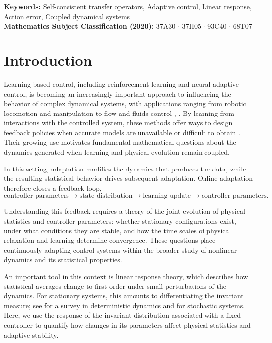 \documentclass[11pt]{article}
\theoremstyle{definition}
\theoremstyle{remark}
\begin{document}
\textbf{Keywords:} Self-consistent transfer operators, Adaptive control, Linear response, Action error, Coupled dynamical systems \\
\textbf{Mathematics Subject Classification (2020):} 37A30 $\cdot$ 37H05 $\cdot$ 93C40 $\cdot$ 68T07

\tableofcontents

\section{Introduction}


Learning-based control, including reinforcement learning and neural adaptive control, is becoming an increasingly important approach to influencing the behavior of complex dynamical systems, with applications ranging from robotic locomotion and manipulation to flow and fluids control \cite{TangEtAl2025}, \cite{BruntonEtAl2020}. By learning from interactions with the controlled system, these methods offer ways to design feedback policies when accurate models are unavailable or difficult to obtain \cite{Recht2019} \cite{Annaswamy2023}. Their growing use motivates fundamental mathematical questions about the dynamics generated when learning and physical evolution remain coupled.

In this setting, adaptation modifies the dynamics that produces the data, while the resulting statistical behavior drives subsequent adaptation.
Online adaptation therefore closes a feedback loop,
\[
  \text{controller parameters}
  \longrightarrow
  \text{state distribution}
  \longrightarrow
  \text{learning update}
  \longrightarrow
  \text{controller parameters}.
\]

Understanding this feedback requires a theory of the joint evolution of physical statistics and controller parameters: whether stationary configurations exist, under what conditions they are stable, and how the time scales of physical relaxation and learning determine convergence. These questions place continuously adapting control systems within the broader study of nonlinear dynamics and its statistical properties.


An important tool in this context is linear response theory,
which describes how statistical averages change to first order
under small perturbations of the dynamics.
For stationary systems, this amounts to differentiating the
invariant measure; see \cite{Baladi2014} for a survey in
deterministic dynamics and
\cite{HairerMajda2010,GalatoloGiulietti2019,GalatoloLucarini2026}
for stochastic systems.
Here, we use the response of the invariant distribution associated
with a fixed controller to quantify how changes in its parameters
affect physical statistics and adaptive stability.
\end{document}
